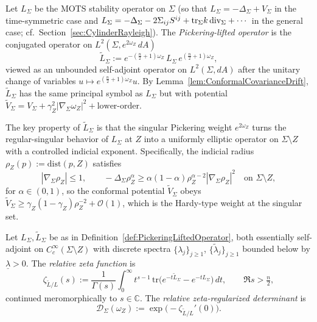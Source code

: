 \begin{definition}\label{def:PickeringLiftedOperator}
Let $L_\Sigma$ be the MOTS stability operator on $\Sigma$ (so that $L_\Sigma=-\Delta_\Sigma+V_\Sigma$ in the time-symmetric case and $L_\Sigma=-\Delta_\Sigma-2\Sigma_{ij}S^{ij}+\mathrm{tr}_\Sigma k\,\mathrm{div}_\Sigma+\cdots$ in the general case; cf.\ Section~\ref{sec:CylinderRayleigh}). The \emph{Pickering-lifted operator} is the conjugated operator on $L^2(\Sigma,e^{2\omega_Z}\,dA)$
\begin{equation}\label{eq:PickeringLiftedOperator}
    \tilde L_\Sigma
    :=
    e^{-(\frac n2+1)\omega_Z}\,L_\Sigma\,e^{(\frac n2+1)\omega_Z},
\end{equation}
viewed as an unbounded self-adjoint operator on $L^2(\Sigma,dA)$ after the unitary change of variables $u\mapsto e^{(\frac n2+1)\omega_Z}u$. By Lemma~\ref{lem:ConformalCovarianceDrift}, $\tilde L_\Sigma$ has the same principal symbol as $L_\Sigma$ but with potential $\tilde V_\Sigma=V_\Sigma+\gamma_Z^2|\nabla_\Sigma\omega_Z|^2+\text{lower-order}$.
\end{definition}

The key property of $\tilde L_\Sigma$ is that the singular Pickering weight $e^{2\omega_Z}$ turns the regular-singular behavior of $L_\Sigma$ at $Z$ into a uniformly elliptic operator on $\Sigma\setminus Z$ with a controlled indicial exponent. Specifically, the indicial radius $\rho_Z(p):=\mathrm{dist}(p,Z)$ satisfies
\begin{equation}\label{eq:IndicialRadiusControl}
    |\nabla_\Sigma \rho_Z| \le 1,
    \qquad
    -\Delta_\Sigma \rho_Z^\alpha \ge \alpha(1-\alpha)\rho_Z^{\alpha-2}|\nabla_\Sigma\rho_Z|^2
    \quad\text{on }\Sigma\setminus Z,
\end{equation}
for $\alpha\in(0,1)$, so the conformal potential $\tilde V_\Sigma$ obeys $\tilde V_\Sigma\ge \gamma_Z(1-\gamma_Z)\rho_Z^{-2}+\mathcal O(1)$, which is the Hardy-type weight at the singular set.

\begin{definition}\label{def:RelativeZetaDeterminant}
Let $L_\Sigma,\tilde L_\Sigma$ be as in Definition~\ref{def:PickeringLiftedOperator}, both essentially self-adjoint on $C_c^\infty(\Sigma\setminus Z)$ with discrete spectra $\{\lambda_j\}_{j\ge1}$, $\{\tilde\lambda_j\}_{j\ge1}$ bounded below by $\underline\lambda>0$. The \emph{relative zeta function} is
\begin{equation}\label{eq:RelativeZeta}
    \zeta_{\tilde L/L}(s)
    :=
    \frac{1}{\Gamma(s)}
    \int_0^\infty t^{s-1}\,\mathrm{tr}\bigl(e^{-t\tilde L_\Sigma}-e^{-tL_\Sigma}\bigr)\,dt,
    \qquad \Re s>\tfrac{n}{2},
\end{equation}
continued meromorphically to $s\in\mathbb C$. The \emph{relative zeta-regularized determinant} is
\begin{equation}\label{eq:RelativeDet}
    \mathscr D_\Sigma(\omega_Z)
    :=
    \exp\bigl(-\zeta_{\tilde L/L}'(0)\bigr).
\end{equation}
\end{definition}

